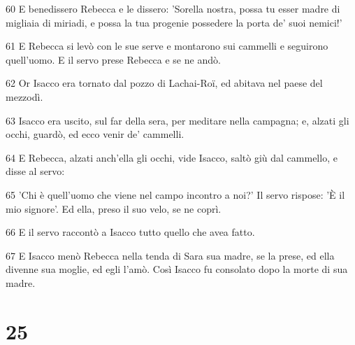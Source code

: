 \par 60 E benedissero Rebecca e le dissero: 'Sorella nostra, possa tu esser madre di migliaia di miriadi, e possa la tua progenie possedere la porta de' suoi nemici!'
\par 61 E Rebecca si levò con le sue serve e montarono sui cammelli e seguirono quell'uomo. E il servo prese Rebecca e se ne andò.
\par 62 Or Isacco era tornato dal pozzo di Lachai-Roï, ed abitava nel paese del mezzodì.
\par 63 Isacco era uscito, sul far della sera, per meditare nella campagna; e, alzati gli occhi, guardò, ed ecco venir de' cammelli.
\par 64 E Rebecca, alzati anch'ella gli occhi, vide Isacco, saltò giù dal cammello, e disse al servo:
\par 65 'Chi è quell'uomo che viene nel campo incontro a noi?' Il servo rispose: 'È il mio signore'. Ed ella, preso il suo velo, se ne coprì.
\par 66 E il servo raccontò a Isacco tutto quello che avea fatto.
\par 67 E Isacco menò Rebecca nella tenda di Sara sua madre, se la prese, ed ella divenne sua moglie, ed egli l'amò. Così Isacco fu consolato dopo la morte di sua madre.

\chapter{25}


